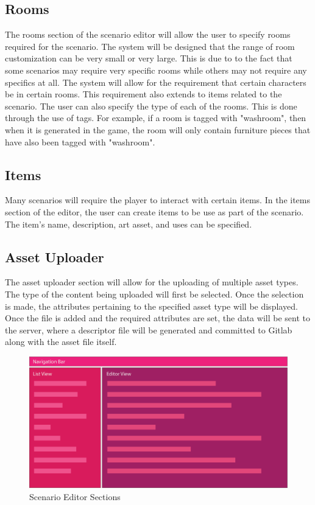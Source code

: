 \clearpage
\subsection{Rooms}
The rooms section of the scenario editor will allow the user to specify rooms required for the scenario. The system will be designed that the range of room customization can be very small or very large. This is due to to the fact that some scenarios may require very specific rooms while others may not require any specifics at all. The system will allow for the requirement that certain characters be in certain rooms. This requirement also extends to items related to the scenario. The user can also specify the type of each of the rooms. This is done through the use of tags. For example, if a room is tagged with "washroom", then when it is generated in the game, the room will only contain furniture pieces that have also been tagged with "washroom".

\subsection{Items}
Many scenarios will require the player to interact with certain items. In the items section of the editor, the user can create items to be use as part of the scenario. The item's name, description, art asset, and uses can be specified.

\subsection{Asset Uploader}
The asset uploader section will allow for the uploading of multiple asset types. The type of the content being uploaded will first be selected. Once the selection is made, the attributes pertaining to the specified asset type will be displayed. Once the file is added and the required attributes are set, the data will be sent to the server, where a descriptor file will be generated and committed to Gitlab along with the asset file itself.

\begin{figure}[H]
	\centering\includegraphics[width=.7\linewidth]{images/scenario_editor_sections}
	\caption{Scenario Editor Sections}
	\label{fig:scenario_sections}
\end{figure}

